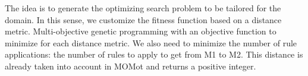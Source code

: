 

The idea is to generate the optimizing search problem to be tailored for the domain. In this sense, we customize the fitness function based on a distance metric. 
Multi-objective genetic programming with an objective function to minimize for each distance metric.
We also need to minimize the number of rule applications: the number of rules to apply to get from M1 to M2. This distance is already taken into account in MOMot and returns a positive integer.